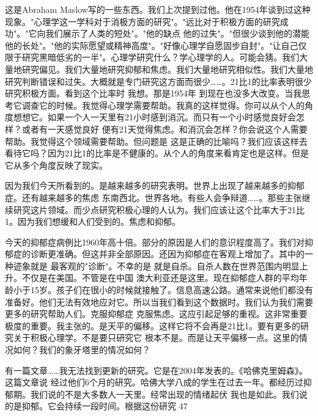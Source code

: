 这是Abraham Maslow写的一些东西。我们上次提到过他。他在1954年谈到过这种现象。"心理学这一学科对于消极方面的研究"。"远比对于积极方面的研究成功"。"它向我们展示了人类的短处"。"他的缺点 他的过失"。"但很少谈到他的潜能 他的长处"。"他的实际愿望或精神高度"。"好像心理学自愿固步自封"。"让自己仅限于研究黑暗低劣的一半"。心理学研究什么？学心理学的人。可能会猜。我们大量地研究偏见。我们大量地研究抑郁和焦虑。我们大量地研究相似性。我们大量地研究判断错误和过失。大概就是专门研究这方面而很少……。21比1的比率表明很少研究积极方面。看到这个比率时 我想。那是1954年 到现在也没多大改变。当我思考它调查它的时候。我觉得心理学需要帮助。我真的这样觉得。你可以从个人的角度想想它。如果一个人一天里有21小时感到消沉。而只有一个小时感觉良好会怎样？或者有一天感觉良好 便有21天觉得焦虑。和消沉会怎样？你会说这个人需要帮助。我觉得这个领域需要帮助。但问题是 这是正确的比喻吗？我们应该这样去看待它吗？因为21比1的比率是不健康的。从个人的角度来看肯定也是这样。但是它从多个角度反映了现实。 

因为我们今天所看到的。是越来越多的研究表明。世界上出现了越来越多的抑郁症。还有越来越多的焦虑 东南西北。世界各地。有些人会争辩道……。那些主张继续研究这片领域。而少点研究积极心理的人认为。我们应该让这个比率大于21比1。因为我们想缓和人们受到的。焦虑和抑郁。 

今天的抑郁症病例比1960年高十倍。部分的原因是人们的意识程度高了。我们对抑郁症的诊断更准确。但这并非全部原因。还因为抑郁症在客观上增加了。其中的一种迹象就是 最客观的"诊断"。不幸的是 就是自杀。自杀人数在世界范围内明显上升。不仅是在美国。不管是在中国 澳大利亚还是这里。现在抑郁症人群的平均年龄小于15岁。孩子们在很小的时候就接触了。信息高速公路。通常来说他们都没有准备好。他们无法有效地应对它。所以当我们看到这个数据时。我们认为我们需要更多的研究帮助人们。克服抑郁症 克服焦虑。这应引起足够的重视。这非常重要 极度的重要。我主张的。是天平的偏移。这样它将不会再是21比1。要有更多的研究关于积极心理学。不是要只研究它 根本不是。而是让天平偏移一点。这里的情况如何？我们的象牙塔里的情况如何？ 

有一篇文章……我无法找到更新的研究。它是在2004年发表的。《哈佛克里姆森》。这篇文章说 经过他们6个月的研究。哈佛大学八成的学生在过去一年。都经历过抑郁期。我们说的不是大多数人一天里。经常出现的情绪起伏 我也是如此。我们说的是抑郁。它会持续一段时间。根据这份研究 47%

